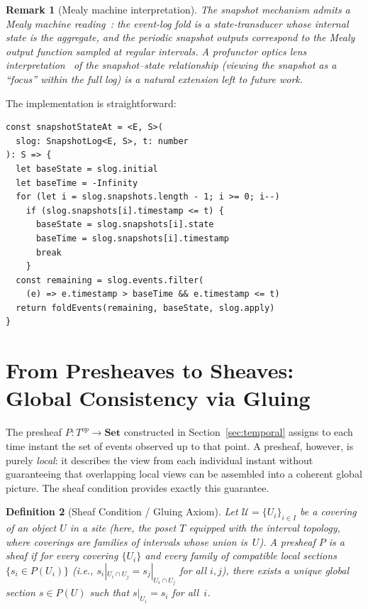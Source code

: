 \documentclass[11pt,a4paper]{article}
\newtheorem{definition}{Definition}[section]
\newtheorem{remark}[definition]{Remark}
\begin{document}
\begin{remark}[Mealy machine interpretation]
\label{rem:mealy}
The snapshot mechanism admits a Mealy machine reading~\citep{eilenberg1974}:
the event-log fold is a state-transducer whose internal state is the
aggregate, and the periodic snapshot outputs correspond to the Mealy
output function sampled at regular intervals. A profunctor optics
lens interpretation~\citep{pickering2017} of the snapshot--state
relationship (viewing the snapshot as a ``focus'' within the full log)
is a natural extension left to future work.
\end{remark}

The implementation is straightforward:

\begin{lstlisting}[caption={Efficient state reconstruction via snapshots.}]
const snapshotStateAt = <E, S>(
  slog: SnapshotLog<E, S>, t: number
): S => {
  let baseState = slog.initial
  let baseTime = -Infinity
  for (let i = slog.snapshots.length - 1; i >= 0; i--)
    if (slog.snapshots[i].timestamp <= t) {
      baseState = slog.snapshots[i].state
      baseTime = slog.snapshots[i].timestamp
      break
    }
  const remaining = slog.events.filter(
    (e) => e.timestamp > baseTime && e.timestamp <= t)
  return foldEvents(remaining, baseState, slog.apply)
}
\end{lstlisting}

\section{From Presheaves to Sheaves: Global Consistency via Gluing}
\label{sec:sheaf}

The presheaf $P:T^{op}\to\mathbf{Set}$ constructed in
Section~\ref{sec:temporal} assigns to each time instant the set of events
observed up to that point. A presheaf, however, is purely \emph{local}: it
describes the view from each individual instant without guaranteeing that
overlapping local views can be assembled into a coherent global picture.
The sheaf condition provides exactly this guarantee.

\begin{definition}[Sheaf Condition / Gluing Axiom]
\label{def:sheaf}
Let $\mathcal{U} = \{U_i\}_{i\in I}$ be a covering of an object $U$ in
a site (here, the poset $T$ equipped with the interval
topology, where coverings are families of intervals whose union is~$U$).
A presheaf $P$ is a \emph{sheaf} if for every covering $\{U_i\}$ and
every family of compatible local sections $\{s_i \in P(U_i)\}$
(i.e., $s_i|_{U_i \cap U_j} = s_j|_{U_i \cap U_j}$ for all $i,j$),
there exists a \emph{unique} global section $s \in P(U)$ such that
$s|_{U_i} = s_i$ for all~$i$.
\end{definition}
\end{document}
